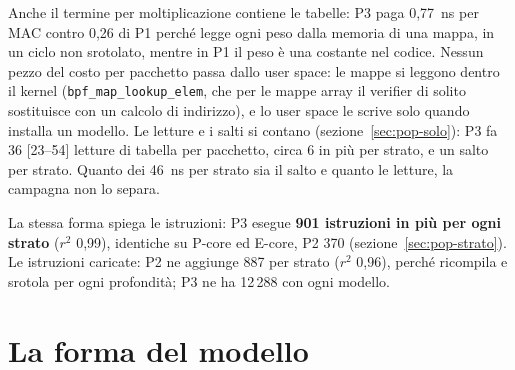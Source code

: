 \documentclass[11pt,a4paper,oneside]{report}
\begin{document}
Anche il termine per moltiplicazione contiene le tabelle: P3 paga 0,77~ns per MAC
contro 0,26 di P1 perché legge ogni peso dalla memoria di una mappa, in un ciclo
non srotolato, mentre in P1 il peso è una costante nel codice. Nessun pezzo del
costo per pacchetto passa dallo user space: le mappe si leggono dentro il kernel
(\texttt{bpf\_map\_lookup\_elem}, che per le mappe array il verifier di solito
sostituisce con un calcolo di indirizzo), e lo user space le scrive solo quando
installa un modello. Le letture e i salti si contano
(sezione~\ref{sec:pop-solo}): P3 fa 36 [23--54] letture di tabella per
pacchetto, circa 6 in più per strato, e un salto per strato. Quanto dei 46~ns per
strato sia il salto e quanto le letture, la campagna non lo separa.

La stessa forma spiega le istruzioni: P3 esegue \textbf{901 istruzioni in più per
ogni strato} ($r^2$ 0,99), identiche su P-core ed E-core, P2 370 (sezione~\ref{sec:pop-strato}). Le istruzioni
caricate: P2 ne aggiunge 887 per strato ($r^2$ 0,96), perché ricompila e srotola
per ogni profondità; P3 ne ha 12\,288 con ogni modello.

\section{La forma del modello}
\end{document}
